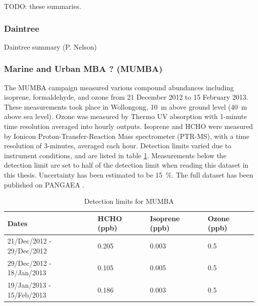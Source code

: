    TODO: these summaries.
    
    \subsubsection{Daintree}
      Daintree summary (P. Nelson)
    
    \subsubsection{Marine and Urban MBA ? (MUMBA)}
      \label{Model:Datasets:MUMBA}
      
      The MUMBA campaign \parencite{PatonWalsh2013} measured various compound abundances including isoprene, formaldehyde, and ozone from 21 December 2012 to 15 February 2013.
      These measurements took place in Wollongong, 10~m above ground level (40~m above sea level).
      Ozone was measured by Thermo UV absorption with 1-minute time resolution averaged into hourly outputs.
      Isoprene and HCHO were measured by Ionicon Proton-Transfer-Reaction Mass spectrometer (PTR-MS), with a time resolution of 3-minutes, averaged each hour.
      Detection limits varied due to instrument conditions, and are listed in table \ref{Model:Datasets:MUMBA:tab_detectionlimits}.
      Measurements below the detection limit are set to half of the detection limit when reading this dataset in this thesis.
      Uncertainty has been estimated to be 15~\%.
      The full dataset has been published on PANGAEA \parencite{Guerette2017}.
    
      \begin{table}
        \caption{Detection limits for MUMBA}
        \begin{tabular}{  l |  l  l  l }
          
          \textbf{Dates} & \textbf{HCHO (ppb)} & \textbf{Isoprene (ppb)} & \textbf{Ozone (ppb)}
          \\ \hline
          21/Dec/2012 - 29/Dec/2012 & 0.205 & 0.003 & 0.5 \\
          29/Dec/2012 - 18/Jan/2013 & 0.105 & 0.005 & 0.5 \\
          19/Jan/2013 - 15/Feb/2013 & 0.186 & 0.003 & 0.5 \\
        \end{tabular}
        \label{Model:Datasets:MUMBA:tab_detectionlimits}
      \end{table}
    
